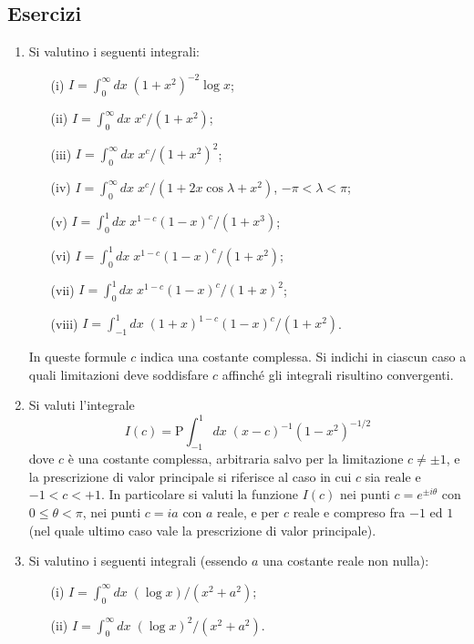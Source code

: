 \documentclass[11pt, a4paper]{book}
\numberwithin{equation}{section}
\newenvironment{esercizi}{\subsection*{Esercizi}\begin{enumerate}}{\end{enumerate}}
\begin{document}
\begin{esercizi}
\item Si valutino i seguenti integrali:
    \begin{enumerate}
        \item[(i)] $I = \displaystyle\int_0^\infty dx\; (1+x^2)^{-2} \log x$;
        \item[(ii)] $I = \displaystyle\int_0^\infty dx\; x^c/(1+x^2)$;
        \item[(iii)] $I = \displaystyle\int_0^\infty dx\; x^c/(1+x^2)^2$;
        \item[(iv)] $I = \displaystyle\int_0^\infty dx\; x^c/(1+2x\cos\lambda+x^2)$, $-\pi < \lambda < \pi$;
        \item[(v)] $I = \displaystyle\int_0^1 dx\; x^{1-c}(1-x)^c/(1+x^3)$;
        \item[(vi)] $I = \displaystyle\int_0^1 dx\; x^{1-c}(1-x)^c/(1+x^2)$;
        \item[(vii)] $I = \displaystyle\int_0^1 dx\; x^{1-c}(1-x)^c/(1+x)^2$;
        \item[(viii)] $I = \displaystyle\int_{-1}^1 dx\; (1+x)^{1-c}(1-x)^c/(1+x^2)$.
    \end{enumerate}
    In queste formule $c$ indica una costante complessa. Si indichi in ciascun
    caso a quali limitazioni deve soddisfare $c$ affinché gli integrali risultino
    convergenti.

\item Si valuti l'integrale
    \[
        I(c) = \mathrm{P}\int_{-1}^1 dx\; (x-c)^{-1}(1-x^2)^{-1/2}
    \]
    dove $c$ è una costante complessa, arbitraria salvo per la limitazione
    $c \neq \pm 1$, e la prescrizione di valor principale si riferisce al caso
    in cui $c$ sia reale e $-1 < c < +1$. In particolare si valuti la funzione
    $I(c)$ nei punti $c = e^{\pm i\theta}$ con $0 \leq \theta < \pi$, nei punti
    $c = ia$ con $a$ reale, e per $c$ reale e compreso fra $-1$ ed $1$ (nel quale
    ultimo caso vale la prescrizione di valor principale).

\item Si valutino i seguenti integrali (essendo $a$ una costante reale non nulla):
    \begin{enumerate}
        \item[(i)] $I = \displaystyle\int_0^\infty dx\; (\log x)/(x^2+a^2)$;
        \item[(ii)] $I = \displaystyle\int_0^\infty dx\; (\log x)^2/(x^2+a^2)$.
    \end{enumerate}
\end{esercizi}
\end{document}
